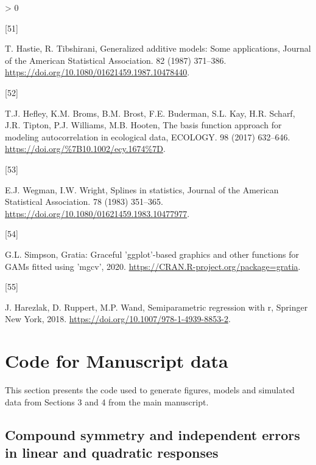 \documentclass[
]{article}
\newlength{\cslhangindent}
\newlength{\csllabelwidth}
\newenvironment{CSLReferences}[2] %
 {%
  \setlength{\parindent}{0pt}
  \ifodd #1 \everypar{\setlength{\hangindent}{\cslhangindent}}\ignorespaces\fi
  \ifnum #2 > 0
  \setlength{\parskip}{#2\baselineskip}
  \fi
 }%
 {}
\newcommand{\CSLLeftMargin}[1]{\parbox[t]{\csllabelwidth}{#1}}
\newcommand{\CSLRightInline}[1]{\parbox[t]{\linewidth - \csllabelwidth}{#1}\break}
\begin{document}
\begin{CSLReferences}{0}{0}
\leavevmode\hypertarget{ref-hastie1987}{}%
\CSLLeftMargin{{[}51{]} }
\CSLRightInline{T. Hastie, R. Tibshirani, Generalized additive models: Some applications, Journal of the American Statistical Association. 82 (1987) 371--386. \url{https://doi.org/10.1080/01621459.1987.10478440}.}

\leavevmode\hypertarget{ref-hefley2017}{}%
\CSLLeftMargin{{[}52{]} }
\CSLRightInline{T.J. Hefley, K.M. Broms, B.M. Brost, F.E. Buderman, S.L. Kay, H.R. Scharf, J.R. Tipton, P.J. Williams, M.B. Hooten, {The basis function approach for modeling autocorrelation in ecological data}, {ECOLOGY}. {98} (2017) 632--646. \url{https://doi.org/\%7B10.1002/ecy.1674\%7D}.}

\leavevmode\hypertarget{ref-wegman1983}{}%
\CSLLeftMargin{{[}53{]} }
\CSLRightInline{E.J. Wegman, I.W. Wright, Splines in statistics, Journal of the American Statistical Association. 78 (1983) 351--365. \url{https://doi.org/10.1080/01621459.1983.10477977}.}

\leavevmode\hypertarget{ref-gratia}{}%
\CSLLeftMargin{{[}54{]} }
\CSLRightInline{G.L. Simpson, Gratia: Graceful 'ggplot'-based graphics and other functions for GAMs fitted using 'mgcv', 2020. \url{https://CRAN.R-project.org/package=gratia}.}

\leavevmode\hypertarget{ref-harezlak2018}{}%
\CSLLeftMargin{{[}55{]} }
\CSLRightInline{J. Harezlak, D. Ruppert, M.P. Wand, Semiparametric regression with r, Springer New York, 2018. \url{https://doi.org/10.1007/978-1-4939-8853-2}.}

\end{CSLReferences}

\hypertarget{appendix-appendix}{%
\appendix}


\hypertarget{code-for-manuscript-data}{%
\section{Code for Manuscript data}\label{code-for-manuscript-data}}

This section presents the code used to generate figures, models and simulated data from Sections 3 and 4 from the main manuscript.

\hypertarget{compound-symmetry-and-independent-errors-in-linear-and-quadratic-responses}{%
\subsection{Compound symmetry and independent errors in linear and quadratic responses}\label{compound-symmetry-and-independent-errors-in-linear-and-quadratic-responses}}
\end{document}
